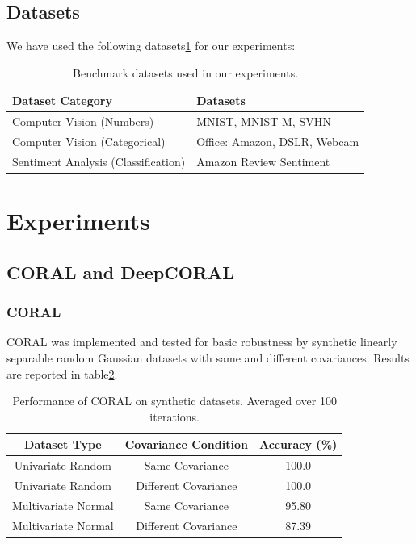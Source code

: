 \documentclass{article}
\begin{document}
\subsection{Datasets}
We have used the following datasets\ref{tab:datasets} for our experiments:
\begin{table}
  \centering
  \caption{Benchmark datasets used in our experiments.}
  \label{tab:datasets}
  \begin{tabular}{ll}
      \toprule
      \textbf{Dataset Category} & \textbf{Datasets} \\
      \midrule
      Computer Vision (Numbers)     & MNIST, MNIST-M, SVHN \\
      Computer Vision (Categorical) & Office: Amazon, DSLR, Webcam \\
      Sentiment Analysis (Classification)  & Amazon Review Sentiment \\
      \bottomrule
  \end{tabular}
\end{table}


\section{Experiments}
\subsection{CORAL and DeepCORAL}
\subsubsection{CORAL}
CORAL was implemented and tested for basic robustness by synthetic linearly separable random Gaussian datasets with same and different covariances. Results are reported in table\ref{tab:coral}.
\begin{table}
  \centering
  \caption{Performance of CORAL on synthetic datasets. Averaged over 100 iterations.}
  \label{tab:coral}
  \begin{tabular}{ccc}
    \toprule
    \textbf{Dataset Type} & \textbf{Covariance Condition} & \textbf{Accuracy (\%)} \\
    \midrule
    Univariate Random & Same Covariance & 100.0 \\
    Univariate Random & Different Covariance & 100.0 \\
    Multivariate Normal & Same Covariance & 95.80 \\
    Multivariate Normal & Different Covariance & 87.39 \\
    \bottomrule
  \end{tabular}
\end{table}
\end{document}

